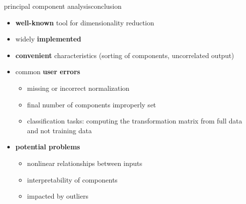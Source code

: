 \begin{frame}{principal component analysis}{conclusion}
    \begin{itemize}
			\item	\textbf{well-known} tool for dimensionality reduction
			\item widely \textbf{implemented}
			\item \textbf{convenient} characteristics (sorting of components, uncorrelated output)
			\smallskip
			\item<2-> common \textbf{user errors}
				\begin{itemize}
					\item missing or incorrect normalization 
					\item final number of components improperly set
					\item classification tasks: computing the transformation matrix from full data and not training data
				\end{itemize}
			\smallskip
			\item<3-> \textbf{potential problems}
			\begin{itemize}
					\item nonlinear relationships between inputs
					\item interpretability of components
					\item impacted by outliers
			\end{itemize}
		\end{itemize}	
\end{frame}
